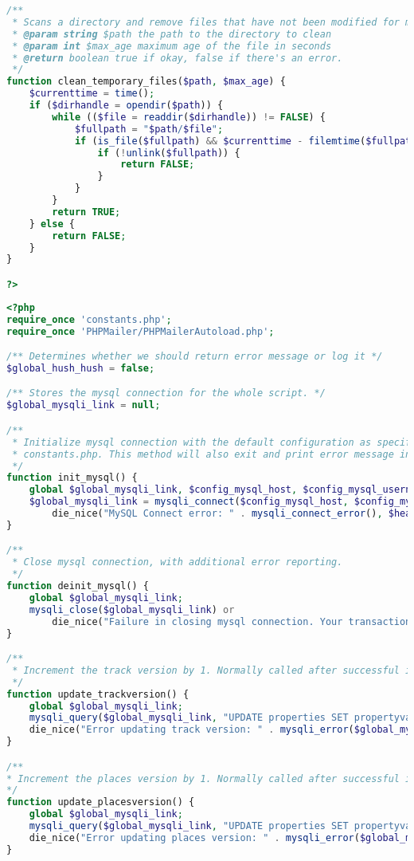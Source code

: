 \begin{lstlisting}[language=PHP,basicstyle=\tiny,caption=handle.php,label={lst:handle.php}]
/**
 * Scans a directory and remove files that have not been modified for max_age
 * @param string $path the path to the directory to clean 
 * @param int $max_age maximum age of the file in seconds
 * @return boolean true if okay, false if there's an error.
 */
function clean_temporary_files($path, $max_age) {
	$currenttime = time();
	if ($dirhandle = opendir($path)) {
		while (($file = readdir($dirhandle)) != FALSE) {
			$fullpath = "$path/$file";
			if (is_file($fullpath) && $currenttime - filemtime($fullpath) > $max_age) {
				if (!unlink($fullpath)) {
					return FALSE;
				}
			}
		}
		return TRUE;
	} else {
		return FALSE;
	}
}

?>
\end{lstlisting}

\begin{lstlisting}[language=PHP,basicstyle=\tiny,caption=utils.php,label={lst:utils.php}]
<?php
require_once 'constants.php';
require_once 'PHPMailer/PHPMailerAutoload.php';

/** Determines whether we should return error message or log it */
$global_hush_hush = false;

/** Stores the mysql connection for the whole script. */
$global_mysqli_link = null;

/**
 * Initialize mysql connection with the default configuration as specified in
 * constants.php. This method will also exit and print error message in case of problem.
 */
function init_mysql() {
	global $global_mysqli_link, $config_mysql_host, $config_mysql_username, $config_mysql_password, $config_mysql_database;
	$global_mysqli_link = mysqli_connect($config_mysql_host, $config_mysql_username, $config_mysql_password, $config_mysql_database) or
		die_nice("MySQL Connect error: " . mysqli_connect_error(), $header_printed);
}

/**
 * Close mysql connection, with additional error reporting.
 */
function deinit_mysql() {
	global $global_mysqli_link;
	mysqli_close($global_mysqli_link) or
		die_nice("Failure in closing mysql connection. Your transaction may have been processed.");
}

/**
 * Increment the track version by 1. Normally called after successful insert/delete/update
 */
function update_trackversion() {
	global $global_mysqli_link;
	mysqli_query($global_mysqli_link, "UPDATE properties SET propertyvalue=propertyvalue+1 WHERE propertyname='trackversion'") or
	die_nice("Error updating track version: " . mysqli_error($global_mysqli_link));
}

/**
* Increment the places version by 1. Normally called after successful insert/delete/update
*/
function update_placesversion() {
	global $global_mysqli_link;
	mysqli_query($global_mysqli_link, "UPDATE properties SET propertyvalue=propertyvalue+1 WHERE propertyname='placesversion'") or
	die_nice("Error updating places version: " . mysqli_error($global_mysqli_link));
}


\end{lstlisting}
